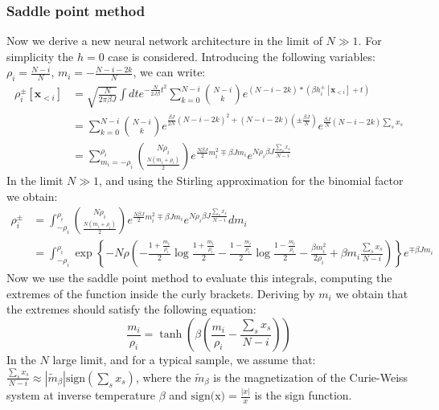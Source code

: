 \documentclass[aps,physrev,10pt,floatfix,longbibliography,nofootinbib,reprint]{revtex4-2}
\begin{document}
\subsubsection{Saddle point method}
Now we derive a new neural network architecture in the limit of $N \gg 1$. For simplicity the $h=0$ case is considered. Introducing the following variables: $\rho_i = \frac{N-i}{N}$, $m_i = -\frac{N-i-2k}{N}$, we can write:
 \begin{align*}
 \rho_i^{\pm}[\mathbf{x}_{<i}] &= \sqrt{\frac{N}{2\pi \beta J}}\int dt e^{-\frac{N}{2J \beta}t^{2}} 
 \sum_{k=0}^{N-i} \binom{N-i}{k} e^{(N-i-2k)*(\beta h_i^{\pm}[\mathbf{x}_{<i}] + t)}\\
 &= \sum_{k=0}^{N-i} \binom{N-i}{k}e^{\frac{\beta J}{2N}\left(N-i-2k\right)^{2}+\left(N-i-2k\right)\left(\pm\frac{\beta J}{N}\right)} e^{\frac{\beta J}{N}\left(N-i-2k\right) \sum_s x_s} \\
 &= \sum_{m_i=-\rho_i}^{\rho_i} \binom{N\rho_i}{\frac{N(m_i+\rho_i)}{2}} e^{\frac{N \beta J}{2}m_i^{2} \mp \beta J m_i } e^{N \rho_i \beta J \frac{\sum_s x_s}{N-i}}
\end{align*}
In the limit $N \gg 1$, and using the Stirling approximation for the binomial factor we obtain:
 \begin{align*}
 \rho_i^{\pm} &= 
  \int_{-\rho_i}^{\rho_i} \binom{N\rho_i}{\frac{N(m_i+\rho_i)}{2}} e^{\frac{N \beta J}{2}m_i^{2} \mp \beta J m_i } e^{N \rho_i \beta J \frac{\sum_s x_s}{N-i}} dm_i \\
& =  \int_{-\rho_i}^{\rho_i} \exp\left\{-N\rho\left( -\frac{1+\frac{m_i}{\rho_i}}{2} \log\frac{1+\frac{m_i}{\rho_i}}{2} - \frac{1-\frac{m_i}{\rho_i}}{2} \log\frac{1-\frac{m_i}{\rho_i}}{2}   - \frac{\beta m_i^2}{2 \rho_i} + \beta m_i \frac{\sum_s x_s}{N-i}\right) \right\} e^{\mp \beta J m_i}
\end{align*}
Now we use the saddle point method to evaluate this integrals, computing the extremes of the function inside the curly brackets. Deriving by $m_i$ we obtain that the extremes should satisfy the following equation:
\begin{equation}
\frac{m_i}{\rho_i} = \tanh \left( \beta(\frac{m_i}{\rho_i} - \frac{\sum_s x_s}{N-i}) \right)
\label{eq:extrem_i}
\end{equation}
In the $N$ large limit, and for a typical sample, we assume that: $\frac{\sum_s x_s}{N-i} \approx |\tilde{m}_{\beta}| \text{sign}(\sum_s x_s)$, where the $\tilde{m}_{\beta}$ is the magnetization of the Curie-Weiss system at inverse temperature $\beta$ and $\text{sign(x)} = \frac{|x|}{x}$ is the sign function.
\end{document}
